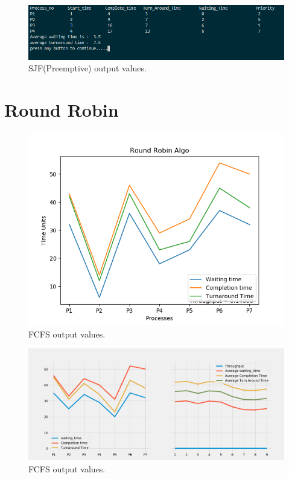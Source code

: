 \documentclass[11pt,a4paper]{report}
\begin{document}
{\begin{figure}[H]
	\centering
	\includegraphics[scale=0.75]{./img/priority_np_out.PNG}
	\caption{SJF(Preemptive) output values.}
\end{figure}}


\chapter{Round Robin}

\begin{figure}[H]
	\centering
	\includegraphics[scale=0.8]{./img/ROUND_ROBIN_output.png}
	\caption{FCFS output values.}
\end{figure}

\begin{figure}[H]

	\includegraphics[scale=0.4]{./img/ROUND_ROBIN.png}
	\caption{FCFS output values.}
\end{figure}
\end{document}
